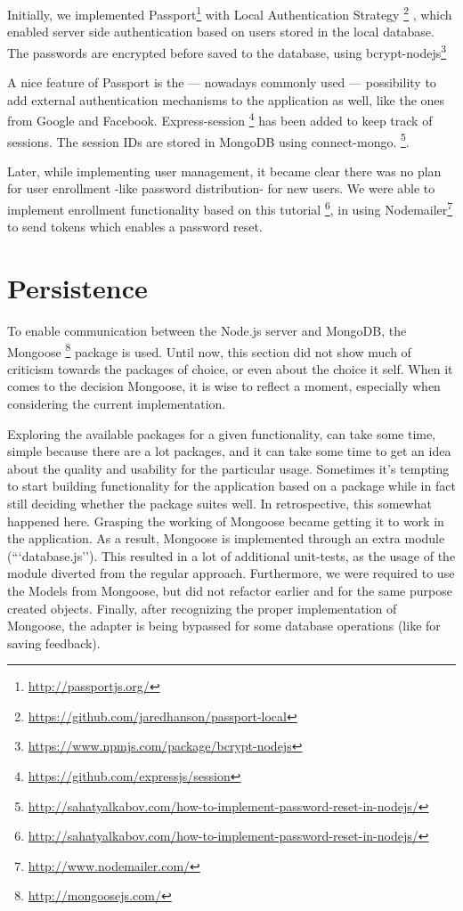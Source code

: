 Initially, we implemented Passport\footnote{\url{http://passportjs.org/}} 
with Local Authentication Strategy
\footnote{\url{https://github.com/jaredhanson/passport-local}}
, which enabled server side authentication based on users stored in the local
database. The passwords are encrypted before saved to the database, using
bcrypt-nodejs\footnote{\url{https://www.npmjs.com/package/bcrypt-nodejs}}

A nice feature of Passport is the --- nowadays commonly used --- 
possibility to add external authentication mechanisms to the application as 
well, like the ones from Google and Facebook. Express-session
\footnote{\url{https://github.com/expressjs/session}} has been added to keep
track of sessions. The session IDs are stored in MongoDB using connect-mongo.
\footnote{\url{http://sahatyalkabov.com/how-to-implement-password-reset-in-nodejs/}}. 

Later, while implementing user management, it became clear there was no plan for
user enrollment -like password distribution- for new users. We were able to
implement enrollment functionality based on this tutorial
\footnote{\url{http://sahatyalkabov.com/how-to-implement-password-reset-in-nodejs/}},
in using Nodemailer\footnote{\url{http://www.nodemailer.com/}} to send tokens
which enables a password reset.

\section{Persistence}
To enable communication between the Node.js server and MongoDB, the Mongoose
\footnote{\url{http://mongoosejs.com/}} package is used. Until now, this section
did not show much of criticism towards the packages of choice, or even about the
choice it self. When it comes to the decision Mongoose, it is wise to reflect a
moment, especially when considering the current implementation.

Exploring the available packages for a given functionality, can take some time,
simple because there are a lot packages, and it can take some time to get an
idea about the quality and usability for the particular usage. Sometimes it's
tempting to start building functionality for the application based on a package
while in fact still deciding whether the package suites well. In retrospective,
this somewhat happened here. Grasping the working of Mongoose became getting it
to work in the application. As a result, Mongoose is implemented through an 
extra module (```database.js''). This resulted in a lot of additional 
unit-tests, as the usage of the module diverted from the regular approach. 
Furthermore, we were required to use the Models from Mongoose, but did not
refactor earlier and for the same purpose created objects. Finally, after 
recognizing the proper implementation of Mongoose, the adapter is being bypassed
for some database operations (like for saving feedback).

